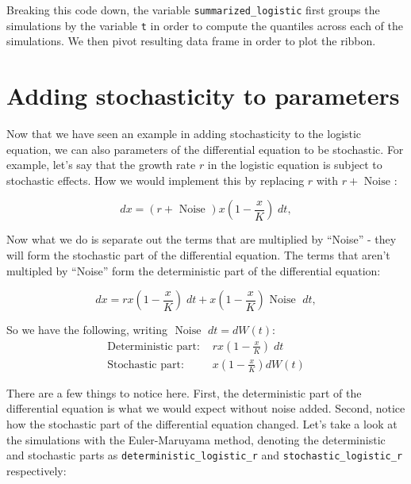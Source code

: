 \documentclass[
]{book}
\theoremstyle{definition}
\theoremstyle{definition}
\theoremstyle{definition}
\theoremstyle{remark}
\begin{document}
Breaking this code down, the variable \texttt{summarized\_logistic} first groups the simulations by the variable \texttt{t} in order to compute the quantiles across each of the simulations. We then pivot resulting data frame in order to plot the ribbon.

\hypertarget{adding-stochasticity-to-parameters}{%
\section{Adding stochasticity to parameters}\label{adding-stochasticity-to-parameters}}

Now that we have seen an example in adding stochasticity to the logistic equation, we can also parameters of the differential equation to be stochastic. For example, let's say that the growth rate \(r\) in the logistic equation is subject to stochastic effects. How we would implement this by replacing \(r\) with \(r + \mbox{ Noise }\):

\begin{equation}
dx = (r + \mbox{ Noise } )x \left(1 - \frac{x}{K} \right) \; dt,
\end{equation}

Now what we do is separate out the terms that are multiplied by ``Noise'' - they will form the stochastic part of the differential equation. The terms that aren't multipled by ``Noise'' form the deterministic part of the differential equation:

\begin{equation}
dx = r  x \left(1 - \frac{x}{K} \right) \; dt + x \left(1 - \frac{x}{K} \right) \mbox{ Noise } \; dt,
\end{equation}

So we have the following, writing \(\mbox{ Noise } \; dt = dW(t)\):
\begin{align*}
\mbox{Deterministic part: } & rx \left(1 - \frac{x}{K} \right) \; dt \\
\mbox{Stochastic part: } & x \left(1 - \frac{x}{K} \right) dW(t)
\end{align*}

There are a few things to notice here. First, the deterministic part of the differential equation is what we would expect without noise added. Second, notice how the stochastic part of the differential equation changed. Let's take a look at the simulations with the Euler-Maruyama method, denoting the deterministic and stochastic parts as \texttt{deterministic\_logistic\_r} and \texttt{stochastic\_logistic\_r} respectively:
\end{document}
